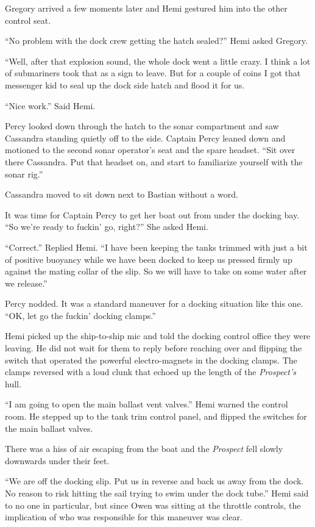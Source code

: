 \documentclass[
]{scrbook}
\begin{document}
Gregory arrived a few moments later and Hemi gestured him into the other
control seat.

``No problem with the dock crew getting the hatch sealed?'' Hemi asked
Gregory.

``Well, after that explosion sound, the whole dock went a little crazy.
I think a lot of submariners took that as a sign to leave. But for a
couple of coins I got that messenger kid to seal up the dock side hatch
and flood it for us.

``Nice work.'' Said Hemi.

Percy looked down through the hatch to the sonar compartment and saw
Cassandra standing quietly off to the side. Captain Percy leaned down
and motioned to the second sonar operator's seat and the spare headset.
``Sit over there Cassandra. Put that headset on, and start to
familiarize yourself with the sonar rig.''

Cassandra moved to sit down next to Bastian without a word.

It was time for Captain Percy to get her boat out from under the docking
bay. ``So we're ready to fuckin' go, right?'' She asked Hemi.

``Correct.'' Replied Hemi. ``I have been keeping the tanks trimmed with
just a bit of positive buoyancy while we have been docked to keep us
pressed firmly up against the mating collar of the slip. So we will have
to take on some water after we release.''

Percy nodded. It was a standard maneuver for a docking situation like
this one. ``OK, let go the fuckin' docking clamps.''

Hemi picked up the ship-to-ship mic and told the docking control office
they were leaving. He did not wait for them to reply before reaching
over and flipping the switch that operated the powerful electro-magnets
in the docking clamps. The clamps reversed with a loud clunk that echoed
up the length of the \emph{Prospect's} hull.

``I am going to open the main ballast vent valves.'' Hemi warned the
control room. He stepped up to the tank trim control panel, and flipped
the switches for the main ballast valves.

There was a hiss of air escaping from the boat and the \emph{Prospect}
fell slowly downwards under their feet.

``We are off the docking slip. Put us in reverse and back us away from
the dock. No reason to risk hitting the sail trying to swim under the
dock tube.'' Hemi said to no one in particular, but since Owen was
sitting at the throttle controls, the implication of who was responsible
for this maneuver was clear.
\end{document}

